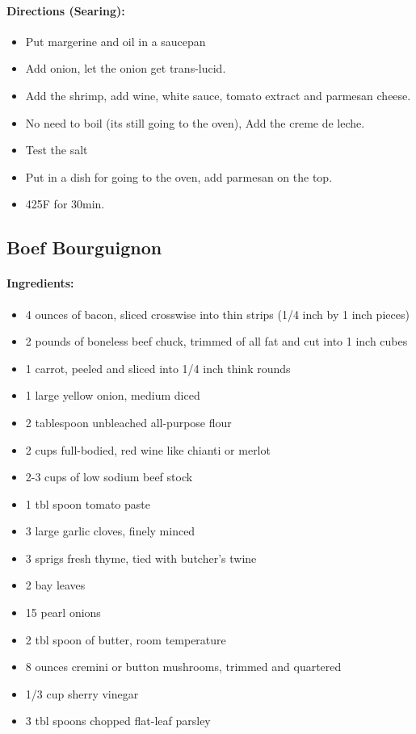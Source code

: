 \documentclass{article}
\begin{document}
\paragraph{Directions (Searing):}
\begin{itemize}
	\item Put margerine and oil in a saucepan
	\item Add onion, let the onion get trans-lucid.
	\item Add the shrimp, add wine, white sauce, tomato extract and parmesan cheese.
	\item No need to boil (its still going to the oven), Add the creme de leche.
	\item Test the salt
	\item Put in a dish for going to the oven, add parmesan on the top.
	\item 425F for 30min.
\end{itemize}

\subsection{Boef Bourguignon}

\paragraph{Ingredients:}

\begin{itemize}
	\item 4 ounces of bacon, sliced crosswise into thin strips (1/4 inch by 1 inch pieces)
	\item 2 pounds of boneless beef chuck, trimmed of all fat and cut into 1 inch cubes
	\item 1 carrot, peeled and sliced into 1/4 inch think rounds
	\item 1 large yellow onion, medium diced
	\item 2 tablespoon unbleached all-purpose flour
	\item 2 cups full-bodied, red wine like chianti or merlot
	\item 2-3 cups of low sodium beef stock
	\item 1 tbl spoon tomato paste
	\item 3 large garlic cloves, finely minced
	\item 3 sprigs fresh thyme, tied with butcher's twine
	\item 2 bay leaves
	\item 15 pearl onions
	\item 2 tbl spoon of butter, room temperature
	\item 8 ounces cremini or button mushrooms, trimmed and quartered
	\item 1/3 cup sherry vinegar
	\item 3 tbl spoons chopped flat-leaf parsley
\end{itemize}
\end{document}
